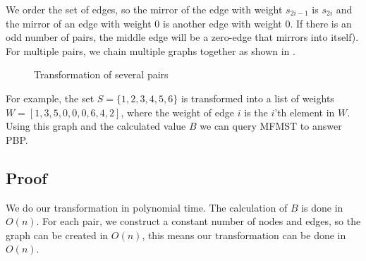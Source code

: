 We order the set of edges, so the mirror of the edge with weight $s_{2i-1}$ is $s_{2i}$ and the mirror of an edge with weight 0 is another edge with weight 0. If there is an odd number of pairs, the middle edge will be a zero-edge that mirrors into itself). For multiple pairs, we chain multiple graphs together as shown in . 
\begin{figure}[htb]
\centering
{}
\caption{Transformation of several pairs}
\label{fig:transform2}
\end{figure}

For example, the set $S=\lbrace 1,2,3,4,5,6 \rbrace$ is transformed into a list of weights $W=[1,3,5,0,0,0,6,4,2]$, where the weight of edge $i$ is the $i$'th element in $W$.
\noindent
Using this graph and the calculated value $B$ we can query MFMST to answer PBP.

\subsection{Proof}

We do our transformation in polynomial time. The calculation of $B$ is done in $O(n)$. For each pair, we construct a constant number of nodes and edges, so the graph can be created in $O(n)$, this means our transformation can be done in $O(n)$.

